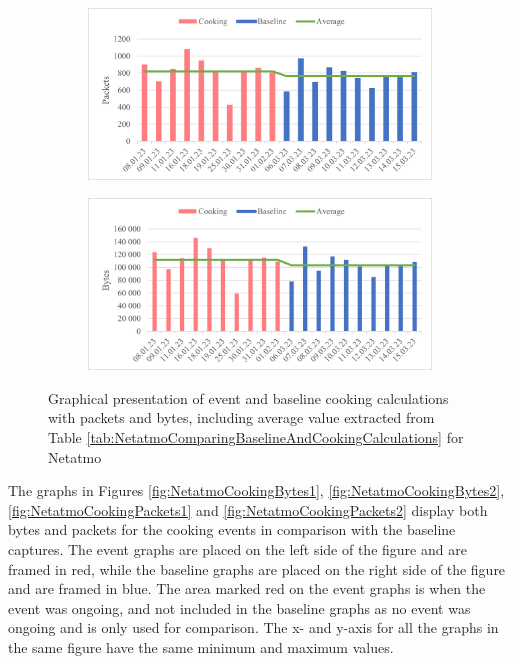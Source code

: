 \begin{figure}[H]
    \centering
    \begin{subfigure}{0.8\textwidth}
       \centering
       \includegraphics[width=1\hsize]{figures/Netatmo_Cooking_Calculations_Packets.png} 
    \end{subfigure}
    \begin{subfigure}{0.8\textwidth}
        \centering
        \includegraphics[width=1\hsize]{figures/Netatmo_Cooking_Calculations_Bytes.png} 
    \end{subfigure}
    \caption{Graphical presentation of event and baseline cooking calculations with packets and bytes, including average value extracted from Table \ref{tab:NetatmoComparingBaselineAndCookingCalculations} for Netatmo}
    \label{fig:NetatmoCookingCalculations}
\end{figure}

The graphs in Figures \ref{fig:NetatmoCookingBytes1}, \ref{fig:NetatmoCookingBytes2}, \ref{fig:NetatmoCookingPackets1} and \ref{fig:NetatmoCookingPackets2} display both bytes and packets for the cooking events in comparison with the baseline captures. The event graphs are placed on the left side of the figure and are framed in red, while the baseline graphs are placed on the right side of the figure and are framed in blue. The area marked red on the event graphs is when the event was ongoing, and not included in the baseline graphs as no event was ongoing and is only used for comparison. The x- and y-axis for all the graphs in the same figure have the same minimum and maximum values. 

